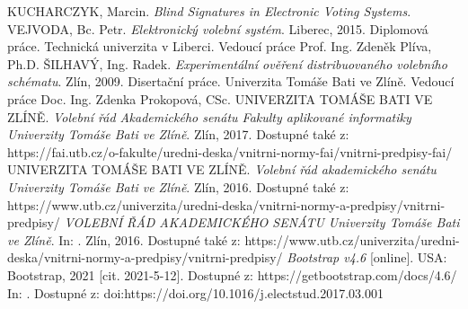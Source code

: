 \begin{thebibliography}{41}

KUCHARCZYK, Marcin. \textit{Blind Signatures in Electronic Voting Systems}.
VEJVODA, Bc. Petr. \textit{Elektronický volební systém}. Liberec, 2015. Diplomová práce. Technická univerzita v Liberci. Vedoucí práce Prof. Ing. Zdeněk Plíva, Ph.D.
ŠILHAVÝ, Ing. Radek. \textit{Experimentální ověření distribuovaného volebního schématu}. Zlín, 2009. Disertační práce. Univerzita Tomáše Bati ve Zlíně. Vedoucí práce Doc. Ing. Zdenka Prokopová, CSc.
UNIVERZITA TOMÁŠE BATI VE ZLÍNĚ. \textit{Volební řád Akademického senátu Fakulty aplikované informatiky Univerzity Tomáše Bati ve Zlíně}. Zlín, 2017. Dostupné také z: https://fai.utb.cz/o-fakulte/uredni-deska/vnitrni-normy-fai/vnitrni-predpisy-fai/
UNIVERZITA TOMÁŠE BATI VE ZLÍNĚ. \textit{Volební řád akademického senátu Univerzity Tomáše Bati ve Zlíně}. Zlín, 2016. Dostupné také z: https://www.utb.cz/univerzita/uredni-deska/vnitrni-normy-a-predpisy/vnitrni-predpisy/
\textit{VOLEBNÍ ŘÁD AKADEMICKÉHO SENÁTU Univerzity Tomáše Bati ve Zlíně}. In: . Zlín, 2016. Dostupné také z: https://www.utb.cz/univerzita/uredni-deska/vnitrni-normy-a-predpisy/vnitrni-predpisy/
\textit{Bootstrap v4.6} [online]. USA: Bootstrap, 2021 [cit. 2021-5-12]. Dostupné z: https://getbootstrap.com/docs/4.6/
In: . Dostupné z: doi:https://doi.org/10.1016/j.electstud.2017.03.001


\end{thebibliography}
